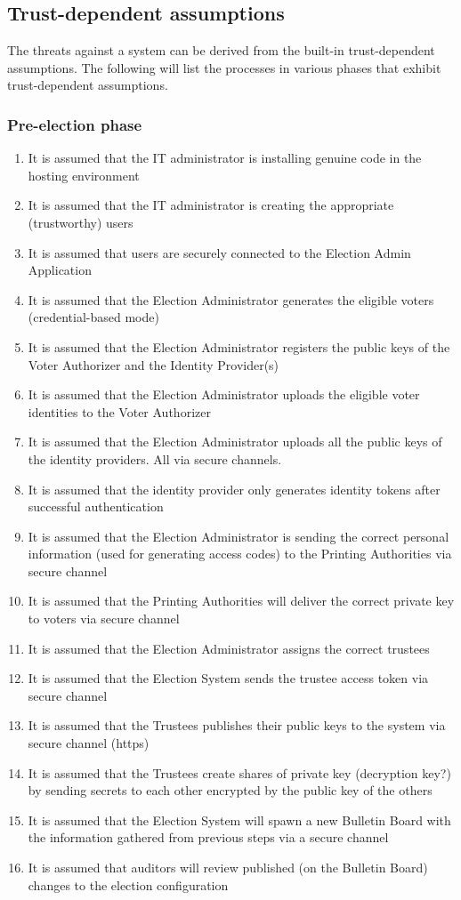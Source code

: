 \subsection{Trust-dependent assumptions} 
The threats against a system can be derived from the built-in trust-dependent assumptions. The following will list the processes in various phases that exhibit trust-dependent assumptions.


\subsubsection{Pre-election phase} 

\begin{enumerate}
\item It is assumed that the IT administrator is installing genuine code in the hosting environment
\item It is assumed that the IT administrator is creating the appropriate (trustworthy) users
\item It is assumed that users are securely connected to the Election Admin Application
\item It is assumed that the Election Administrator generates the eligible voters (credential-based mode)
\item It is assumed that the Election Administrator registers the public keys of the Voter Authorizer and the Identity Provider(s)
\item It is assumed that the Election Administrator uploads the eligible voter identities to the Voter Authorizer
\item It is assumed that the Election Administrator uploads all the public keys of the identity providers. All via secure channels.
\item It is assumed that the identity provider only generates identity tokens after successful authentication
\item It is assumed that the Election Administrator is sending the correct personal information (used for generating access codes) to the Printing Authorities via secure channel
\item It is assumed that the Printing Authorities will deliver the correct private key to voters via secure channel
\item It is assumed that the Election Administrator assigns the correct trustees
\item It is assumed that the Election System sends the trustee access token via secure channel
\item It is assumed that the Trustees publishes their public keys to the system via secure channel (https)
\item It is assumed that the Trustees create shares of private key (decryption key?) by sending secrets to each other encrypted by the public key of the others
\item It is assumed that the Election System will spawn a new Bulletin Board with the information gathered from previous steps via a secure channel
\item It is assumed that auditors will review published (on the Bulletin Board) changes to the election configuration
\end{enumerate}


